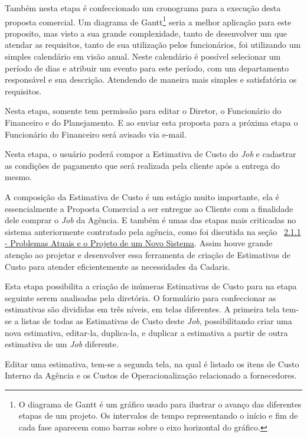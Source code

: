 \documentclass[
  12pt,				%
  openany,
  oneside,
  a4paper,			%
  english,			%
  brazil
]{article}
\numberwithin{figure}{section}
\numberwithin{table}{section}
\newcounter{subsubsubsection}[subsubsection]
\begin{document}
Também nesta etapa é confeccionado um cronograma para a execução desta proposta comercial. Um diagrama de Gantt\footnote{O diagrama de Gantt é um gráfico usado para ilustrar o avanço das diferentes etapas de um projeto. Os intervalos de tempo representando o início e fim de cada fase aparecem como barras sobre o eixo horizontal do gráfico.} seria a melhor aplicação para este proposito, mas visto a sua grande complexidade, tanto de desenvolver um que atendar as requisitos, tanto de sua utilização pelos funcionários, foi utilizando um simples calendário em visão anual. Neste calendário é possível selecionar um período de dias e atribuir um evento para este período, com um departamento responsável e sua descrição. Atendendo de maneira mais simples e satisfatória os requisitos. 

Nesta etapa, somente tem permissão para editar o Diretor, o Funcionário do Financeiro e do Planejamento. E ao enviar esta proposta para a próxima etapa o Funcionário do Financeiro será avisado via e-mail.


Nesta etapa, o usuário poderá compor a Estimativa de Custo do \textit{Job} e cadastrar as condições de pagamento que será realizada pela cliente após a entrega do mesmo.

A composição da Estimativa de Custo é um estágio muito importante, ela é essencialmente a Proposta Comercial a ser entregue ao Cliente com a finalidade dele comprar o \textit{Job} da Agência. E também é umas das etapas mais criticadas no sistema anteriormente contratado pela agência, como foi discutida na seção ~\hyperref[sec:2.1.1]{2.1.1 - Problemas Atuais e o Projeto de um Novo Sistema}. Assim houve grande atenção ao projetar e desenvolver essa ferramenta de criação de Estimativas de Custo para atender eficientemente as necessidades da Cadaris.

Esta etapa possibilita a criação de inúmeras Estimativas de Custo para na etapa seguinte serem analisadas pela diretória. O formulário para confeccionar as estimativas são divididas em três níveis, em telas diferentes. A primeira tela tem-se a listas de todas as Estimativas de Custo deste \textit{Job}, possibilitando criar uma nova estimativa, editar-la, duplica-la, e duplicar a estimativa a partir de outra estimativa de um \textit{Job} diferente.

Editar uma estimativa, tem-se a segunda tela, na qual é listado os itens de Custo Interno da Agência e os Custos de Operacionalização relacionado a fornecedores. 
\end{document}
